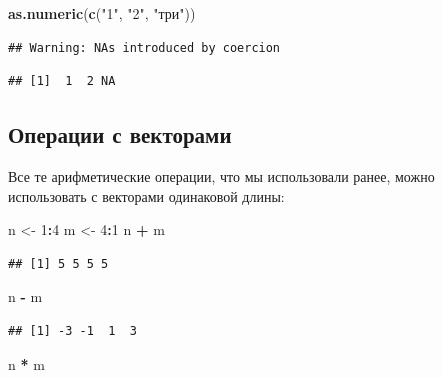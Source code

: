 \documentclass[]{book}
\newenvironment{Shaded}{\begin{snugshade}}{\end{snugshade}}
\newcommand{\DecValTok}[1]{\textcolor[rgb]{0.00,0.00,0.81}{#1}}
\newcommand{\KeywordTok}[1]{\textcolor[rgb]{0.13,0.29,0.53}{\textbf{#1}}}
\newcommand{\NormalTok}[1]{#1}
\newcommand{\OperatorTok}[1]{\textcolor[rgb]{0.81,0.36,0.00}{\textbf{#1}}}
\newcommand{\StringTok}[1]{\textcolor[rgb]{0.31,0.60,0.02}{#1}}
\begin{document}
\begin{Shaded}
\begin{Highlighting}[]
\KeywordTok{as.numeric}\NormalTok{(}\KeywordTok{c}\NormalTok{(}\StringTok{"1"}\NormalTok{, }\StringTok{"2"}\NormalTok{, }\StringTok{"три"}\NormalTok{))}
\end{Highlighting}
\end{Shaded}

\begin{verbatim}
## Warning: NAs introduced by coercion
\end{verbatim}

\begin{verbatim}
## [1]  1  2 NA
\end{verbatim}

\hypertarget{vector_op}{%
\subsection{Операции с векторами}\label{vector_op}}

Все те арифметические операции, что мы использовали ранее, можно использовать с векторами одинаковой длины:

\begin{Shaded}
\begin{Highlighting}[]
\NormalTok{n <-}\StringTok{ }\DecValTok{1}\OperatorTok{:}\DecValTok{4}
\NormalTok{m <-}\StringTok{ }\DecValTok{4}\OperatorTok{:}\DecValTok{1}
\NormalTok{n }\OperatorTok{+}\StringTok{ }\NormalTok{m}
\end{Highlighting}
\end{Shaded}

\begin{verbatim}
## [1] 5 5 5 5
\end{verbatim}

\begin{Shaded}
\begin{Highlighting}[]
\NormalTok{n }\OperatorTok{-}\StringTok{ }\NormalTok{m}
\end{Highlighting}
\end{Shaded}

\begin{verbatim}
## [1] -3 -1  1  3
\end{verbatim}

\begin{Shaded}
\begin{Highlighting}[]
\NormalTok{n }\OperatorTok{*}\StringTok{ }\NormalTok{m}
\end{Highlighting}
\end{Shaded}
\end{document}
